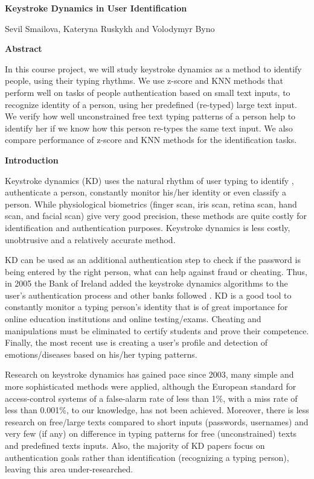 \documentclass[12pt,a4]{article}
\begin{document}
\begin{center}
  \Huge\bf{Keystroke Dynamics in User Identification}
\end{center}

\begin{center}
	Sevil Smailova, Kateryna Ruskykh and Volodymyr Byno
\end{center}

\large\textbf{Abstract}
\bigskip

\normalsize
In this course project, we will study keystroke dynamics as a method to identify people, using their typing rhythms. We use z-score and KNN methods that perform well on tasks of people authentication based on small text inputs, to recognize identity of a person, using her predefined (re-typed) large text input. We verify how well unconstrained free text typing patterns of a person help to identify her if we know how this person re-types the same text input. We also compare performance of z-score and KNN methods for the identification tasks. 

\bigskip

\large\textbf{Introduction}
\bigskip

\normalsize
Keystroke dynamics (KD) uses the natural rhythm of user typing to identify , authenticate a person, constantly monitor his/her identity or even classify a person.  While physiological biometrics (finger scan, iris scan, retina scan, hand scan, and facial scan) give very good precision, these methods are quite costly for identification and authentication purposes. Keystroke dynamics is less costly, unobtrusive and a relatively accurate method.

KD can be used as an additional authentication step to check if the password is being entered by the right person, what can help against fraud or cheating. Thus, in 2005 the Bank of Ireland added the keystroke dynamics algorithms to the user's authentication process and other banks followed \cite{usman1970strengthening}. KD is a good tool to constantly monitor a typing person's identity that is of great importance for online education institutions and online testing/exams. Cheating and manipulations must be eliminated to certify students and prove their competence. Finally, the most recent use is creating a user's profile and detection of emotions/diseases based on his/her typing patterns.

Research on keystroke dynamics has gained pace since 2003, many simple and more sophisticated methods were applied, although the  European standard for access-control systems of a false-alarm rate of less than 1\%, with a miss rate of less than 0.001\%, to our knowledge, has not been achieved. Moreover, there is less research on free/large texts compared to short inputs (passwords, usernames) and very few (if any) on difference in typing patterns for free (unconstrained) texts and predefined texts inputs. Also, the majority of KD papers focus on authentication goals rather than identification (recognizing a typing person), leaving this area under-researched.
\end{document}
